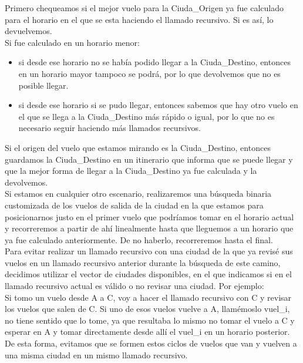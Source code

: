 Primero chequeamos si el mejor vuelo para la Ciuda\_Origen ya fue calculado para el horario en el que se esta haciendo el llamado recursivo. Si es así, lo devuelvemos.\\

Si fue calculado en un horario menor:\\
\begin{itemize}
\item si desde ese horario no se había podido llegar a la Ciuda\_Destino, entonces en un horario mayor tampoco se podrá, por lo que devolvemos que no es posible llegar.
\item si desde ese horario si se pudo llegar, entonces sabemos que hay otro vuelo en el que se llega a la Ciuda\_Destino más rápido o igual, por lo que no es necesario seguir haciendo más llamados recursivos.\\
\end{itemize}

Si el origen del vuelo que estamos mirando es la Ciuda\_Destino, entonces guardamos la Ciuda\_Destino en un itinerario que informa que se puede llegar y que la mejor forma de llegar a la Ciuda\_Destino ya fue calculada y la devolvemos.\\ 

Si estamos en cualquier otro escenario, realizaremos una búsqueda binaria customizada de los vuelos de salida de la ciudad en la que estamos para posicionarnos justo en el primer vuelo que podríamos tomar en el horario actual y recorreremos a partir de ahí linealmente hasta que lleguemos a un horario que ya fue calculado anteriormente. De no haberlo, recorreremos hasta el final.\\

Para evitar realizar un llamado recursivo con una ciudad de la que ya revisé sus vuelos en un llamado recursivo anterior durante la búsqueda de este camino, decidimos utilizar el vector de ciudades disponibles, en el que indicamos si en el llamado recursivo actual es válido o no revisar una ciudad. Por ejemplo:\\

Si tomo un vuelo desde A a C, voy a hacer el llamado recursivo con C y revisar los vuelos que salen de C. Si uno de esos vuelos vuelve a A, llamémoslo vuel\_i, no tiene sentido que lo tome, ya que resultaba lo mismo no tomar el vuelo a C y esperar en A y tomar directamente desde allí el vuel\_i en un horario posterior. De esta forma, evitamos que se formen estos ciclos de vuelos que van y vuelven a una misma ciudad en un mismo llamado recursivo.\\

